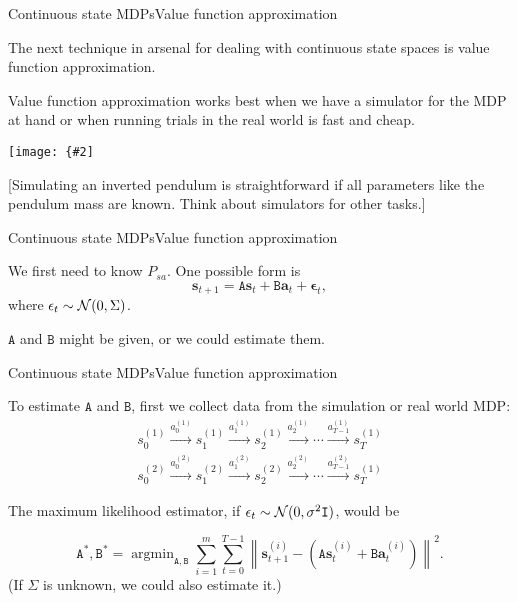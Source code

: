 \documentclass{beamer}
\renewcommand{\vec}[1]{\boldsymbol{#1}}
\newcommand{\mat}[1]{\mathtt{#1}}
\DeclareMathOperator*{\argmin}{argmin}
\newcommand{\myfig}[3]{\centerline{\texttt{[image: \{\#2]}}}
    \centerline{\scriptsize #3}}
\begin{document}
\begin{frame}{Continuous state MDPs}{Value function approximation}

  The next technique in arsenal for dealing with continuous state
  spaces is \alert{value function approximation}.

  \medskip

  Value function approximation works best when we have a
  \alert{simulator} for the MDP at hand or when running trials in the
  real world is fast and cheap.

  \medskip

  \myfig{2in}{ng-sim}{Ng (2017), CS 229 lecture notes, set 12}

  \medskip

  [Simulating an inverted pendulum is straightforward if all
    parameters like the pendulum mass are known. Think about
    simulators for other tasks.]

\end{frame}


\begin{frame}{Continuous state MDPs}{Value function approximation}

  We first need to know $P_{sa}$. One possible form is
  \[ \vec{s}_{t+1} = \mat{A}\vec{s}_t + \mat{B}\vec{a}_t + \vec{\epsilon}_t, \]
  where $\epsilon_t \sim {\cal N}(0,\Sigma)$.

  \medskip

  $\mat{A}$ and $\mat{B}$ might be given, or we could estimate them.

\end{frame}


\begin{frame}{Continuous state MDPs}{Value function approximation}

  To estimate $\mat{A}$ and $\mat{B}$, first we collect data from the
  simulation or real world MDP:
  \begin{eqnarray*}
  s_0^{(1)} \stackrel{a_0^{(1)}}{\rightarrow}
  s_1^{(1)} \stackrel{a_1^{(1)}}{\rightarrow}
  s_2^{(1)} \stackrel{a_2^{(1)}}{\rightarrow} \cdots
   \stackrel{a_{T-1}^{(1)}}{\rightarrow} s_T^{(1)} \\
  s_0^{(2)} \stackrel{a_0^{(2)}}{\rightarrow}
  s_1^{(2)} \stackrel{a_1^{(2)}}{\rightarrow}
  s_2^{(2)} \stackrel{a_2^{(2)}}{\rightarrow} \cdots
  \stackrel{a_{T-1}^{(2)}}{\rightarrow} s_T^{(1)}
  \end{eqnarray*}

  \medskip
  
  The maximum likelihood estimator, if
  $\epsilon_t \sim {\cal N}(0,\sigma^2\mat{I})$, would be

  \[ \mat{A}^*,\mat{B}^* = \argmin_{\mat{A},\mat{B}} \sum_{i=1}^m \sum_{t=0}^{T-1}
  \left\| \vec{s}_{t+1}^{(i)}-\left(\mat{A}\vec{s}_t^{(i)} + \mat{B}\vec{a}_t^{(i)}\right) \right\|^2 .\]
  (If $\Sigma$ is unknown, we could also estimate it.)

\end{frame}
\end{document}
